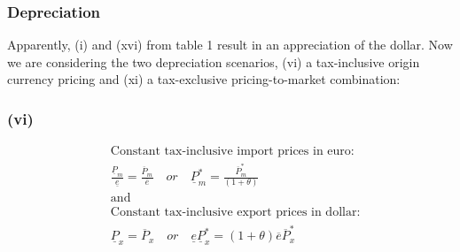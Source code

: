 \subsubsection{Depreciation}
Apparently, (i) and (xvi) from table 1 result in an appreciation of the dollar. Now we are considering the two depreciation scenarios, (vi) a tax-inclusive origin currency pricing and (xi) a tax-exclusive pricing-to-market combination:

\subsubsection*{(vi)}
\begin{equation}\label{vi}
\begin{aligned}
&\text{Constant tax-inclusive import prices in euro:}\\ &\frac{\underline P_m}{\underline e} = \frac{\overline P_m}{\overline e} \quad or \quad \underline P^*_m  = \frac{\overline P^*_m}{(1+\theta)} \\
&\text{and}\\
&\text{Constant tax-inclusive export prices in dollar:}\\ &\underline P_x = \overline P_x \quad or \quad \underline e \underline P_x^* = (1+\theta)\overline e \overline P^*_x
\end{aligned}
\end{equation}

